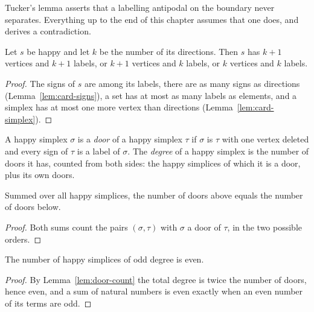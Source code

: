 Tucker's lemma asserts that a labelling antipodal on the boundary never separates.
Everything up to the end of this chapter assumes that one does, and derives a
contradiction.

\begin{lemma}
\label{lem:happy-shape}
\leanok
{}
Let $s$ be happy and let $k$ be the number of its directions. Then $s$ has $k+1$
vertices and $k+1$ labels, or $k+1$ vertices and $k$ labels, or $k$ vertices and $k$
labels.
\end{lemma}
\begin{proof}
\leanok
{}
The signs of $s$ are among its labels, there are as many signs as directions
(Lemma~\ref{lem:card-signs}), a set has at most as many labels as elements, and a
simplex has at most one more vertex than directions (Lemma~\ref{lem:card-simplex}).
\end{proof}

\begin{definition}
\label{def:door}
\leanok
{}
A happy simplex $\sigma$ is a \emph{door} of a happy simplex $\tau$ if $\sigma$ is
$\tau$ with one vertex deleted and every sign of $\tau$ is a label of $\sigma$. The
\emph{degree} of a happy simplex is the number of doors it has, counted from both
sides: the happy simplices of which it is a door, plus its own doors.
\end{definition}

\begin{lemma}
\label{lem:door-count}
\leanok
{}
Summed over all happy simplices, the number of doors above equals the number of doors
below.
\end{lemma}
\begin{proof}
\leanok
Both sums count the pairs $(\sigma, \tau)$ with $\sigma$ a door of $\tau$, in the two
possible orders.
\end{proof}

\begin{lemma}
\label{lem:even-odd-degree}
\leanok
{}
The number of happy simplices of odd degree is even.
\end{lemma}
\begin{proof}
\leanok
{}
By Lemma~\ref{lem:door-count} the total degree is twice the number of doors, hence
even, and a sum of natural numbers is even exactly when an even number of its terms
are odd.
\end{proof}

